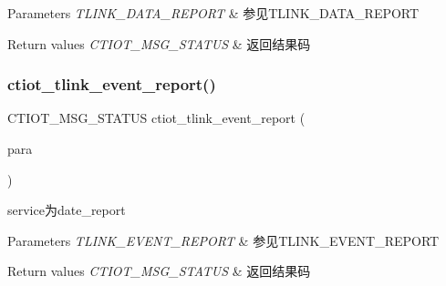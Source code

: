 \begin{DoxyParams}{Parameters}
{\em T\+L\+I\+N\+K\+\_\+\+D\+A\+T\+A\+\_\+\+R\+E\+P\+O\+RT} & 参见T\+L\+I\+N\+K\+\_\+\+D\+A\+T\+A\+\_\+\+R\+E\+P\+O\+RT\\
\hline
\end{DoxyParams}

\begin{DoxyRetVals}{Return values}
{\em C\+T\+I\+O\+T\+\_\+\+M\+S\+G\+\_\+\+S\+T\+A\+T\+US} & 返回结果码 \\
\hline
\end{DoxyRetVals}
\mbox{\label{group___a_p_i_xE6_x8E_xA5_xE5_x8F_xA3_ga6e89a05e9c93fedb069f72d9821d9411}} 
\subsubsection{\texorpdfstring{ctiot\+\_\+tlink\+\_\+event\+\_\+report()}{ctiot\_tlink\_event\_report()}}
{\footnotesize\ttfamily C\+T\+I\+O\+T\+\_\+\+M\+S\+G\+\_\+\+S\+T\+A\+T\+US ctiot\+\_\+tlink\+\_\+event\+\_\+report (\begin{DoxyParamCaption}\item[{\mbox{\hyperlink{structtlink__event__report}{T\+L\+I\+N\+K\+\_\+\+E\+V\+E\+N\+T\+\_\+\+R\+E\+P\+O\+RT}} $\ast$}]{para }\end{DoxyParamCaption})}



service为date\+\_\+report 


\begin{DoxyParams}{Parameters}
{\em T\+L\+I\+N\+K\+\_\+\+E\+V\+E\+N\+T\+\_\+\+R\+E\+P\+O\+RT} & 参见T\+L\+I\+N\+K\+\_\+\+E\+V\+E\+N\+T\+\_\+\+R\+E\+P\+O\+RT\\
\hline
\end{DoxyParams}

\begin{DoxyRetVals}{Return values}
{\em C\+T\+I\+O\+T\+\_\+\+M\+S\+G\+\_\+\+S\+T\+A\+T\+US} & 返回结果码 \\
\hline
\end{DoxyRetVals}
